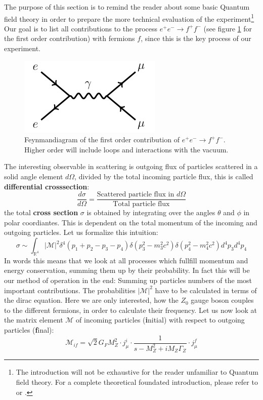 The purpose of this section is to remind the reader about some basic Quantum field theory in order to prepare the 
more technical evaluation of the experiment\footnote{The introduction will not be exhaustive for the reader unfamiliar to
Quantum field theory. For a complete theoretical foundated introduction, please refer to \cite{schroeder} or
\cite{weinberg1996quantum}.} Our goal is to list all contributions to the process $e^{+}e^- \rightarrow f^+ f^-$ (see figure
\ref{fig:eemumu} for the first order contribution) with fermions $f$, since this is the key process of our experiment. 
\begin{figure}[htpb]
    \centering
    \includegraphics[width=0.6\linewidth]{figures/eemumu}
    \caption{Feynmandiagram of the first order contribution of $e^{+}e^- \rightarrow f^+ f^-$. Higher order will include
loops and interactions with the vacuum.}
    \label{fig:eemumu}
\end{figure}
The interesting observable in scattering is outgoing flux of particles scattered in a solid angle element $d\Omega$, divided
by the total incoming particle flux, this is called \textbf{differential crosssection}:
\begin{equation}
    \frac{d\sigma}{d\Omega} = \frac{\text{Scattered particle flux in }d\Omega }{\text{Total particle flux}}
\end{equation}
the total \textbf{cross section} $\sigma$  is obtained
by integrating over the angles $\theta$ and $\phi$ in polar coordiantes. This is dependent on the total momentum
of the incoming and outgoing particles. Let us formalize this intuition: 
\begin{equation}
    \sigma \sim \int_{\mathbb{R}^4} |\mathcal{M}|^2 \delta^4(p_1 + p_2 - p_3 - p_4) 
    \delta(p_3 ^2 - m_3^2 c^2) \delta(p_4 ^2 - m_4^2 c^2) d^4p_3 d^4p_4
    \label{eq:sigma}
\end{equation}
In words this means that we look at all processes which fullfill momentum and energy conservation, summing them up by
their probability. In fact this will be our method of operation in the end: Summing up particles numbers of the most important
contributions. The probabilities $|\mathcal{M}|^2$  have to be calculated in terms of the dirac equation.
Here we are only interested, how the $Z_0$ gauge boson couples to the different fermions, in order to calculate their
frequency. Let us now look at the matrix element $\mathcal{M}$ of incoming particles (\textbf{i}nitial)
with respect to outgoing particles (\textbf{f}inal):
\begin{equation}
    \mathcal{M}_{if} = \sqrt{2} G_F M_Z^2 \cdot j_\mu^{i} \cdot \frac{1}{s - M_Z^2 + iM_Z \Gamma_Z} \cdot j_\mu^{f}
    \label{eq:Mif}
\end{equation}

